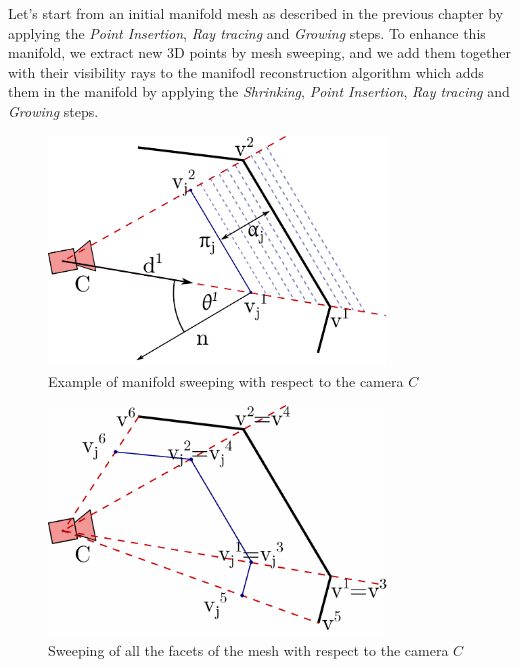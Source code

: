 Let's start from an initial manifold mesh as described in the previous chapter by applying the   \emph{Point Insertion}, \emph{Ray tracing} and \emph{Growing} steps.
To enhance this manifold, we extract new 3D points by mesh sweeping, and we add them together with their visibility rays to the manifodl reconstruction algorithm which adds them in the manifold by applying the \emph{Shrinking}, \emph{Point Insertion}, \emph{Ray tracing} and \emph{Growing} steps.


\begin{figure}[tp]
  \centering
  \includegraphics[width=0.8\textwidth]{././img/ch-sweep/sweep.pdf}
  \caption{Example of manifold sweeping with respect to the camera $C$}
  \label{fig:sweep}
\end{figure}


\begin{figure}[tp]
  \centering
  \includegraphics[width=0.8\textwidth]{./img/ch-sweep/sweepMulti.pdf}
  \caption{Sweeping of all the facets of the mesh with respect to the camera $C$}
  \label{fig:sweepMulti}
\end{figure}


